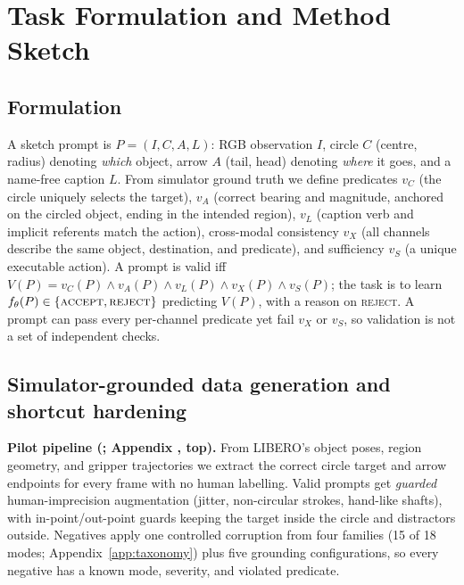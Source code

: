 \documentclass{article} %
\newcommand{\accept}{\textsc{accept}}
\newcommand{\reject}{\textsc{reject}}
\begin{document}
\section{Task Formulation and Method Sketch}
\label{sec:method}

\subsection{Formulation}
\label{sec:formulation}
A sketch prompt is $P=(I,C,A,L)$: RGB observation $I$, circle $C$ (centre, radius) denoting \emph{which} object, arrow $A$ (tail, head) denoting \emph{where} it goes, and a name-free caption $L$. From simulator ground truth we define predicates $v_C$ (the circle uniquely selects the target), $v_A$ (correct bearing and magnitude, anchored on the circled object, ending in the intended region), $v_L$ (caption verb and implicit referents match the action), cross-modal consistency $v_X$ (all channels describe the same object, destination, and predicate), and sufficiency $v_S$ (a unique executable action). A prompt is valid iff $V(P)=v_C(P)\wedge v_A(P)\wedge v_L(P)\wedge v_X(P)\wedge v_S(P)$; the task is to learn $f_\theta(P)\in\{\accept,\reject\}$ predicting $V(P)$, with a reason on \reject. A prompt can pass every per-channel predicate yet fail $v_X$ or $v_S$, so validation is not a set of independent checks.

\subsection{Simulator-grounded data generation and shortcut hardening}
\label{sec:data}
\textbf{Pilot pipeline (; Appendix , top).} From LIBERO's object poses, region geometry, and gripper trajectories we extract the correct circle target and arrow endpoints for every frame with no human labelling. Valid prompts get \emph{guarded} human-imprecision augmentation (jitter, non-circular strokes, hand-like shafts), with in-point/out-point guards keeping the target inside the circle and distractors outside. Negatives apply one controlled corruption from four families (15 of 18 modes; Appendix~\ref{app:taxonomy}) plus five grounding configurations, so every negative has a known mode, severity, and violated predicate.
\end{document}
